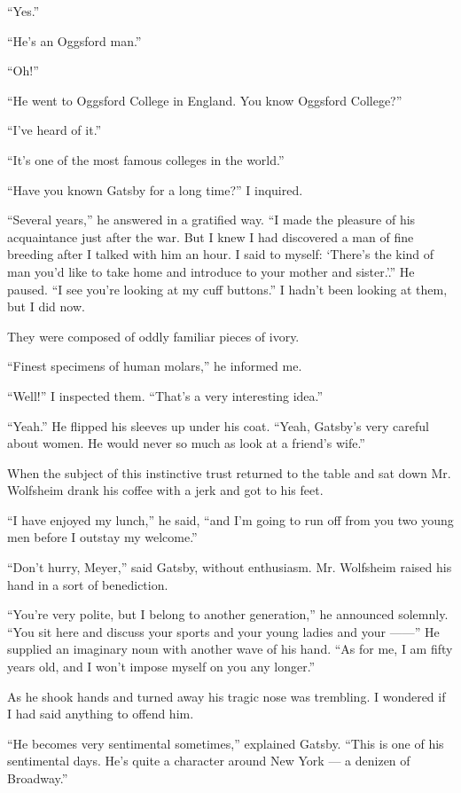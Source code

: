 \documentclass{znotebook}
\begin{document}
``Yes.''

``He’s an Oggsford man.''

``Oh!''

``He went to Oggsford College in England. You know Oggsford College?''

``I’ve heard of it.''

``It’s one of the most famous colleges in the world.''

``Have you known Gatsby for a long time?'' I inquired.

``Several years,'' he answered in a gratified way. ``I made the pleasure of his acquaintance just after the war. But I knew I had discovered a man of fine breeding after I talked with him an hour. I said to myself: ‘There’s the kind of man you’d like to take home and introduce to your mother and sister.’.'' He paused. ``I see you’re looking at my cuff buttons.'' I hadn’t been looking at them, but I did now.

They were composed of oddly familiar pieces of ivory.

``Finest specimens of human molars,'' he informed me.

``Well!'' I inspected them. ``That’s a very interesting idea.''

``Yeah.'' He flipped his sleeves up under his coat. ``Yeah, Gatsby’s very careful about women. He would never so much as look at a friend’s wife.''

When the subject of this instinctive trust returned to the table and sat down Mr. Wolfsheim drank his coffee with a jerk and got to his feet.

``I have enjoyed my lunch,'' he said, ``and I’m going to run off from you two young men before I outstay my welcome.''

``Don’t hurry, Meyer,'' said Gatsby, without enthusiasm. Mr. Wolfsheim raised his hand in a sort of benediction.

``You’re very polite, but I belong to another generation,'' he announced solemnly. ``You sit here and discuss your sports and your young ladies and your ——'' He supplied an imaginary noun with another wave of his hand. ``As for me, I am fifty years old, and I won’t impose myself on you any longer.''

As he shook hands and turned away his tragic nose was trembling. I wondered if I had said anything to offend him.

``He becomes very sentimental sometimes,'' explained Gatsby. ``This is one of his sentimental days. He’s quite a character around New York — a denizen of Broadway.''
\end{document}
